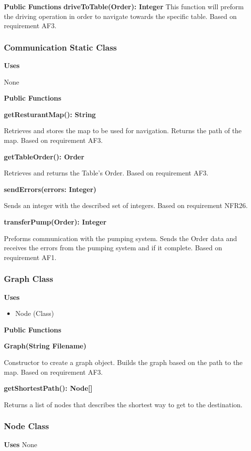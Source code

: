 \documentclass [10pt]{article}
\begin{document}
\textbf{Public Functions}
\textbf{driveToTable(Order): Integer}
This function will preform the driving operation in order to navigate towards the specific table. Based on requirement AF3.

\subsubsection{Communication Static Class}
\textbf{Uses}

None 

\textbf{Public Functions}

\textbf{getResturantMap(): String}

Retrieves and stores the map to be used for navigation. Returns the path of the map. Based on requirement AF3.

\textbf{getTableOrder(): Order}

Retrieves and returns the Table's Order. Based on requirement AF3.

\textbf{sendErrors(errors: Integer)}

Sends an integer with the described set of integers. Based on requirement NFR26.

\textbf{transferPump(Order): Integer}

Preforms communication with the pumping system. Sends the Order data and receives the errors from the pumping system and if it complete. Based on requirement AF1.

\subsubsection{Graph Class}
\textbf{Uses}
\begin{itemize}
	\item Node (Class)
\end{itemize}

\textbf{Public Functions}

\textbf{Graph(String Filename)}

Constructor to create a graph object. Builds the graph based on the path to the map. Based on requirement AF3.

\textbf{getShortestPath(): Node[]}

Returns a list of nodes that describes the shortest way to get to the destination. 


\subsubsection{Node Class}
\textbf{Uses}
None 
\end{document}

